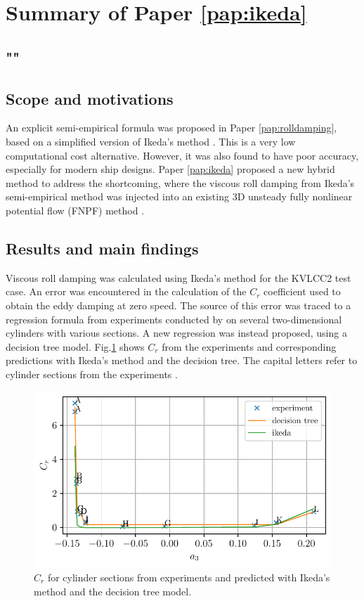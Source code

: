 \section{Summary of Paper \ref{pap:ikeda}}
\subsection*{""}
\subsection*{Scope and motivations}
An explicit semi-empirical formula was proposed in Paper \ref{pap:rolldamping}, based on a simplified version of Ikeda's method \cite{kawaharaSimplePredictionFormula2011}. This is a very low computational cost alternative. However, it was also found to have poor accuracy, especially for modern ship designs. 
Paper \ref{pap:ikeda} proposed a new hybrid method to address the shortcoming, where the viscous roll damping from Ikeda’s semi-empirical method was injected into an existing 3D unsteady fully nonlinear potential flow (FNPF) method \cite{kjellbergFullyNonlinearUnsteady2013}.

\subsection*{Results and main findings}
Viscous roll damping was calculated using Ikeda's method \cite{ikedaComponentsRollDamping1978} for the KVLCC2 test case. An error was encountered in the calculation of the $C_r$ coefficient used to obtain the eddy damping at zero speed. The source of this error was traced to a regression formula from experiments conducted by \textcite{ikedaEddyMakingComponent1978} on several two-dimensional cylinders with various sections. A new regression was instead proposed, using a decision tree model.
Fig.\ref{fig:ikeda_sections} shows $C_r$ from the experiments and corresponding predictions with Ikeda's method and the decision tree. The capital letters refer to cylinder sections from the experiments
\cite{ikedaEddyMakingComponent1978}.
\begin{figure}[h]
\center
\includegraphics[width=\textwidth]{figures/ikeda_sections.pdf}
\vspace{-0.4cm}
\caption{$C_r$ for cylinder sections from experiments and predicted with Ikeda's method and the decision tree model.}
\label{fig:ikeda_sections}
\end{figure}
\FloatBarrier

